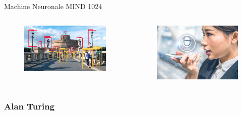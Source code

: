 \documentclass{beamer}
\begin{document}
\begin{frame}{Machine Neuronale MIND 1024}
\begin{itemize}[<+-| alert@+>]
\begin{columns}[T]
\begin{figure}
                \includegraphics[width=1.2\linewidth]{pic/Identification-des-images.jpeg}
                \end{figure}
                \begin{figure}
                \centering
                \includegraphics[width=0.65\linewidth]{pic/Reconnaissance-de-la-voix.jpeg}
                \end{figure}
            \end{columns}
    \end{itemize}
\end{frame}

\subsubsection{Alan Turing}
\end{document}
